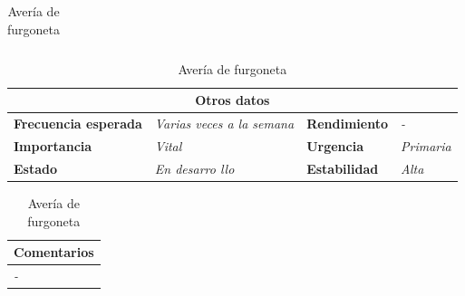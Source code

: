 \documentclass[12pt,spanish]{article}
\begin{document}
\begin{table}[H]
\begin{tabular}{|m{5pt}|m{7.33cm}|m{5pt}|m{7.33cm}|}
	\end{tabular}
	
	\vspace{0.5cm}
	
	\begin{tabular}{|m{3.75cm}|m{3.75cm}|m{3.75cm}|m{3.8cm}|}
		\hline
		\multicolumn{4}{|c|}{\textbf{Otros datos}} \\
		\hline
		\textbf{Frecuencia esperada} & \textit{Varias veces a la semana} & \textbf{Rendimiento} & \textit{-} \\
		\hline
		\textbf{Importancia} & \textit{Vital} & \textbf{Urgencia} & \textit{Primaria} \\
		\hline
		\textbf{Estado} & \textit{En desarro
		llo} & \textbf{Estabilidad} & \textit{Alta} \\
		\hline
	\end{tabular}
	
	\vspace{1cm}
	
	\begin{tabular}{|m{16.2cm}|}
		\hline
		\textbf{Comentarios} \\
		\hline
		\textit{-} \\
		\hline
	\end{tabular}
	
	\caption{Avería de furgoneta}
	
\end{table}
\end{document}
